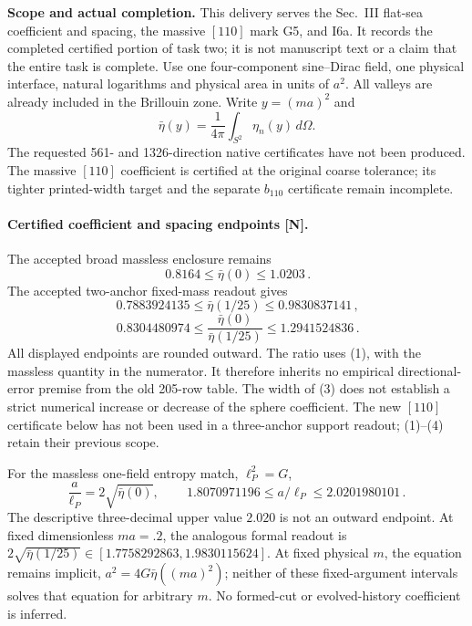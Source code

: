 \documentclass[10pt]{article}
\begin{document}
\noindent\textbf{Scope and actual completion.}
This delivery serves the Sec.~III flat-sea coefficient and spacing,
the massive $[110]$ mark G5, and I6a. It records the completed certified
portion of task two; it is not manuscript text or a claim that the
entire task is complete. Use one four-component sine--Dirac field,
one physical interface, natural logarithms and physical area in
units of $a^2$. All valleys are already included in the Brillouin
zone. Write $y=(ma)^2$ and
\[
 \bar\eta(y)=\frac1{4\pi}\int_{S^2}\eta_n(y)\,d\Omega .
\]
The requested 561- and 1326-direction native certificates have not
been produced. The massive $[110]$ coefficient is certified at
the original coarse tolerance; its tighter printed-width target
and the separate $b_{110}$ certificate remain incomplete.

\paragraph{Certified coefficient and spacing endpoints [N].}
The accepted broad massless enclosure remains
\[
 \boxed{\,0.8164\leq\bar\eta(0)\leq1.0203\,}.
                                                               \tag{1}
\]
The accepted two-anchor fixed-mass readout gives
\[
 \boxed{\,0.7883924135\leq\bar\eta(1/25)\leq0.9830837141\,},
                                                               \tag{2}
\]
\[
 \boxed{\,0.8304480974\leq
        \frac{\bar\eta(0)}{\bar\eta(1/25)}
        \leq1.2941524836\,}.                                    \tag{3}
\]
All displayed endpoints are rounded outward. The ratio uses (1),
with the massless quantity in the numerator. It therefore inherits
no empirical directional-error premise from the old 205-row table.
The width of (3) does not establish a strict numerical increase
or decrease of the sphere coefficient.
The new $[110]$ certificate below has not been used in a
three-anchor support readout; (1)--(4) retain their previous scope.

For the massless one-field entropy match, $\ell_P^2=G$,
\[
 \frac a{\ell_P}=2\sqrt{\bar\eta(0)},\qquad
 \boxed{\,1.8070971196\leq a/\ell_P\leq2.0201980101\,}.
                                                               \tag{4}
\]
The descriptive three-decimal upper value $2.020$ is not an outward
endpoint. At fixed dimensionless $ma=.2$, the analogous formal
readout is $2\sqrt{\bar\eta(1/25)}
\in[1.7758292863,1.9830115624]$.
At fixed physical $m$, the equation remains implicit,
$a^2=4G\bar\eta((ma)^2)$; neither of these fixed-argument intervals
solves that equation for arbitrary $m$. No formed-cut or evolved-history
coefficient is inferred.
\end{document}
